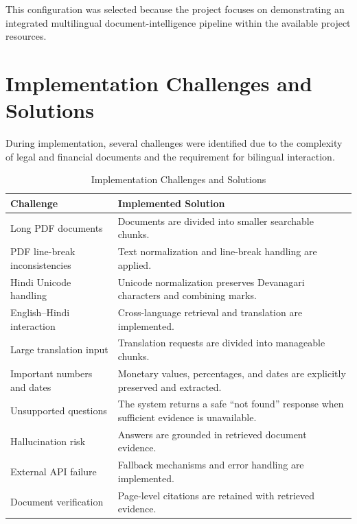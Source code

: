 This configuration was selected because the project focuses on
demonstrating an integrated multilingual document-intelligence
pipeline within the available project resources.

\section{Implementation Challenges and Solutions}

During implementation, several challenges were identified due to the
complexity of legal and financial documents and the requirement for
bilingual interaction.

\begin{table}[H]
\centering
\caption{Implementation Challenges and Solutions}
\begin{tabular}{|p{5cm}|p{8cm}|}
\hline
\textbf{Challenge} & \textbf{Implemented Solution} \\
\hline
Long PDF documents & Documents are divided into smaller searchable chunks. \\
\hline
PDF line-break inconsistencies & Text normalization and line-break handling are applied. \\
\hline
Hindi Unicode handling & Unicode normalization preserves Devanagari characters and combining marks. \\
\hline
English--Hindi interaction & Cross-language retrieval and translation are implemented. \\
\hline
Large translation input & Translation requests are divided into manageable chunks. \\
\hline
Important numbers and dates & Monetary values, percentages, and dates are explicitly preserved and extracted. \\
\hline
Unsupported questions & The system returns a safe ``not found'' response when sufficient evidence is unavailable. \\
\hline
Hallucination risk & Answers are grounded in retrieved document evidence. \\
\hline
External API failure & Fallback mechanisms and error handling are implemented. \\
\hline
Document verification & Page-level citations are retained with retrieved evidence. \\
\hline
\end{tabular}
\end{table}


